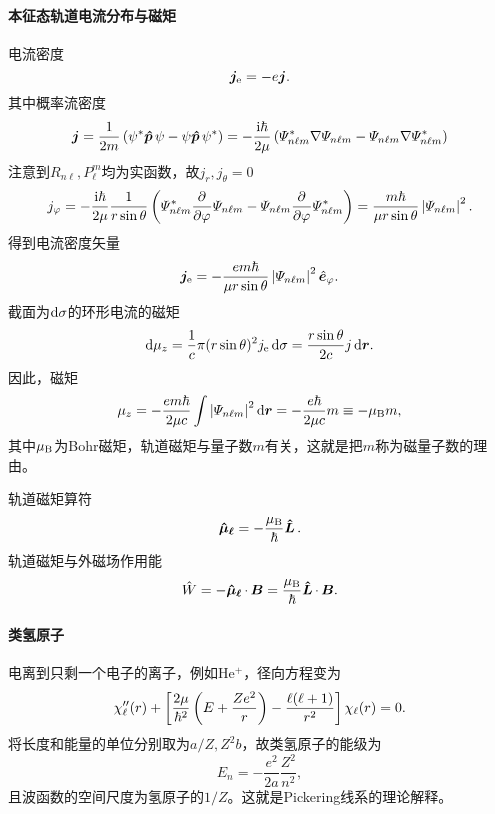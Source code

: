 \paragraph{本征态轨道电流分布与磁矩}
电流密度
\[
	\bm j_\mathrm e=-e\bm j.
\]
其中概率流密度
\[
	\bm j=\frac1{2m}\left(\psi^\ast\bm{\hat p}\!\mathop{}\psi-\psi\bm{\hat p}\!\mathop{}\psi^\ast\right)=-\frac{\mathrm{i}\hbar}{2\mu}\left(\varPsi_{n\ell m}^\ast\nabla\varPsi_{n\ell m}-\varPsi_{n\ell m}\nabla\varPsi_{n\ell m}^\ast\right)
\]
注意到$R_{n\ell},P_\ell^m$均为实函数，故$j_r,j_\theta=0$
\[
	j_\varphi=-\frac{\mathrm{i}\hbar}{2\mu}\frac1{r\sin\theta}\left(\varPsi_{n\ell m}^\ast\frac{\partial^{{}}}{\partial{\varphi}^{{}}}\varPsi_{n\ell m}-\varPsi_{n\ell m}\frac{\partial^{{}}}{\partial{\varphi}^{{}}}\varPsi_{n\ell m}^\ast\right)=\frac{m\hbar}{\mu r\sin\theta}\left\lvert\varPsi_{n\ell m}\right\rvert^2.
\]
得到电流密度矢量
\begin{align}
	\bm j_\mathrm e=-\frac{em\hbar}{\mu r\sin\theta}\left\lvert\varPsi_{n\ell m}\right\rvert^2\mathop{}\!\hat{\bm{e}}_\varphi.
\end{align}
截面为$\mathop{}\!\mathrm{d}\sigma$的环形电流的磁矩
\[
	\mathop{}\!\mathrm{d}\mu_z=\frac1c\pi(r\sin\theta)^2j_\mathrm e\mathop{}\!\mathrm{d}\sigma=\frac{r\sin\theta}{2c}j\mathop{}\!\mathrm{d}\bm r.
\]
因此，磁矩
\begin{align}
	\mu_z=-\frac{em\hbar}{2\mu c}\int\left\lvert\varPsi_{n\ell m}\right\rvert^2\mathop{}\!\mathrm{d}\bm r=-\frac{e\hbar}{2\mu c}m\equiv-\mu_\mathrm B m,
\end{align}
其中$\mu_\mathrm B$为Bohr磁矩，轨道磁矩与量子数$m$有关，这就是把$m$称为磁量子数的理由。

轨道磁矩算符
\[
	\bm{\hat \mu_\ell}\!\mathop{}=-\frac{\mu_\mathrm B}\hbar\bm{\hat L}\!\mathop{}.
\]
轨道磁矩与外磁场作用能
\[
	\hat W=-\bm{\hat \mu_\ell}\!\mathop{}\cdot\,\bm B=\frac{\mu_\mathrm B}\hbar\bm{\hat L}\!\mathop{}\cdot\,\bm B.
\]
\paragraph{类氢原子}电离到只剩一个电子的离子，例如He$^+$，径向方程变为
\[
	\chi''_\ell(r)+\left[\frac{2\mu}{\hbar^2}\left(E+\frac{Ze^2}{r}\right)-\frac{\ell(\ell+1)}{r^2}\right]\chi_\ell(r)=0.
\]
将长度和能量的单位分别取为$a/Z,Z^2b$，故类氢原子的能级为
\[
	E_n=-\frac{e^2}{2a}\frac{Z^2}{n^2},
\]
且波函数的空间尺度为氢原子的$1/Z$。这就是Pickering线系的理论解释。
